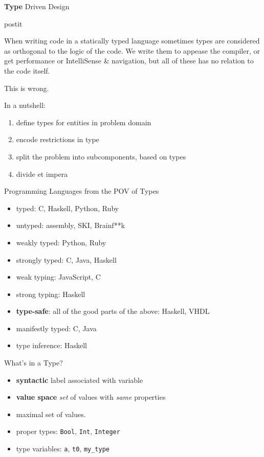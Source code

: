 \documentclass{beamer}
\renewcommand\quote[3]{
  \begin{beamercolorbox}[wd=\textwidth,rounded=true,shadow=true]{postit}
    #3
    \vskip5mm
    \hspace*\fill{\small{#1, \textit{#2}}}
  \end{beamercolorbox}
}
\begin{document}
\begin{frame}{\textbf{Type} Driven Design}
  \quote{-}{-}{
    When writing code in a statically typed language sometimes types are
    considered as orthogonal to the logic of the code. We write them to
    appease the compiler, or get performance or IntelliSense \& navigation, but
    all of these has no relation to the code itself.

    This is wrong.
  }
  \pause
  In a nutshell:
  \begin{enumerate}[<+->]
    \item define types for entities in problem domain
    \item encode restrictions in type
    \item split the problem into subcomponents, based on types
    \item divide et impera
  \end{enumerate}
\end{frame}

\begin{frame}{Programming Languages from the POV of Types}
  \begin{itemize}
    \item typed: C, Haskell, Python, Ruby
    \item untyped: assembly, SKI, Brainf**k
    \pause
    \item weakly typed: Python, Ruby
    \item strongly typed: C, Java, Haskell
    \pause
    \item weak typing: JavaScript, C
    \item strong typing: Haskell
    \pause
    \item \textbf{type-safe}: all of the good parts of the above: Haskell, VHDL
    \pause
    \item manifestly typed: C, Java
    \item type inference: Haskell
  \end{itemize}
\end{frame}

\begin{frame}{What's in a Type?}
  \begin{itemize}[<+->]
    \item \textbf{syntactic} label associated with variable
    \item \textbf{value space} \textit{set} of values with \textit{same}
    properties
    \vskip1cm
    \item maximal set of values.
    \vskip1cm
    \item proper types: \texttt{Bool}, \texttt{Int}, \texttt{Integer}
    \item type variables: \texttt{a}, \texttt{t0}, \texttt{my\_type}
  \end{itemize}
\end{frame}
\end{document}
